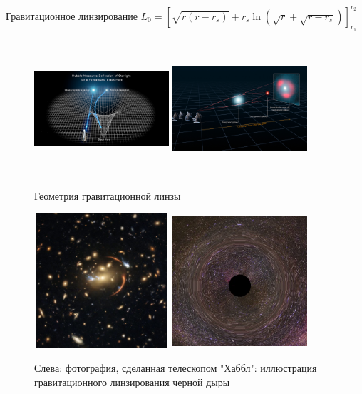 \documentclass[
]{beamer}
\begin{document}
\begin{frame}{Гравитационное линзирование}
$L_0=[\sqrt{r(r-r_s)}+r_s\ln{(\sqrt{r}+\sqrt{r-r_s})}]^{r_2}_{r_1}$
\begin{figure}[H]
	\centering
	\includegraphics[width=5cm, height=5cm]{Gravitational_lensing_by_a_black_hole.jpg}
	\includegraphics[width=5cm, height=5cm]{NCTjtDGTTWDt3m2pDBoa2Z.jpg}
	\caption{Геометрия гравитационной линзы}
\end{figure}
\end{frame}
\begin{frame}
\begin{figure}[H]
	\centering
	\includegraphics[width=5cm, height=5cm]{Galaxy-Cluster-MACSJ0138-0-2155-777x797-1.jpg}
	\includegraphics[width=5cm, height=5cm]{STScI-01FQHAC509H68M895P8V6R0TZP.png}
	\caption{Слева: фотография, сделанная телескопом "Хаббл"\quad{}: иллюстрация гравитационного линзирования черной дыры}
\end{figure}
\end{frame}
\end{document}
